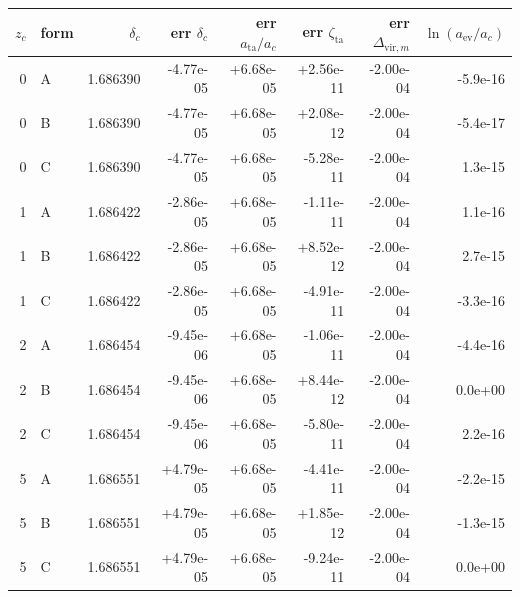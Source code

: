\begin{tabular}{rlrrrrrr}
\toprule
$z_c$ & form & $\delta_c$ & err $\delta_c$ & err $a_\mathrm{ta}/a_c$ & err $\zeta_\mathrm{ta}$ & err $\Delta_{\mathrm{vir},m}$ & $\ln(a_\mathrm{ev}/a_c)$ \\
\midrule
0 & A & 1.686390 & -4.77e-05 & +6.68e-05 & +2.56e-11 & -2.00e-04 & -5.9e-16 \\
0 & B & 1.686390 & -4.77e-05 & +6.68e-05 & +2.08e-12 & -2.00e-04 & -5.4e-17 \\
0 & C & 1.686390 & -4.77e-05 & +6.68e-05 & -5.28e-11 & -2.00e-04 & 1.3e-15 \\
1 & A & 1.686422 & -2.86e-05 & +6.68e-05 & -1.11e-11 & -2.00e-04 & 1.1e-16 \\
1 & B & 1.686422 & -2.86e-05 & +6.68e-05 & +8.52e-12 & -2.00e-04 & 2.7e-15 \\
1 & C & 1.686422 & -2.86e-05 & +6.68e-05 & -4.91e-11 & -2.00e-04 & -3.3e-16 \\
2 & A & 1.686454 & -9.45e-06 & +6.68e-05 & -1.06e-11 & -2.00e-04 & -4.4e-16 \\
2 & B & 1.686454 & -9.45e-06 & +6.68e-05 & +8.44e-12 & -2.00e-04 & 0.0e+00 \\
2 & C & 1.686454 & -9.45e-06 & +6.68e-05 & -5.80e-11 & -2.00e-04 & 2.2e-16 \\
5 & A & 1.686551 & +4.79e-05 & +6.68e-05 & -4.41e-11 & -2.00e-04 & -2.2e-15 \\
5 & B & 1.686551 & +4.79e-05 & +6.68e-05 & +1.85e-12 & -2.00e-04 & -1.3e-15 \\
5 & C & 1.686551 & +4.79e-05 & +6.68e-05 & -9.24e-11 & -2.00e-04 & 0.0e+00 \\
\bottomrule
\end{tabular}
